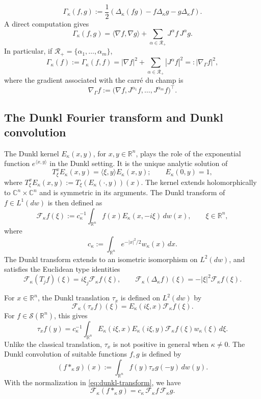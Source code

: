 \documentclass[11pt]{amsart}
\theoremstyle{definition}
\theoremstyle{remark}
\numberwithin{equation}{section}
\newcommand{\R}{\mathbb{R}}
\newcommand{\RR}{\mathcal{R}}
\begin{document}
\[
\Gamma_\kappa(f,g)
:=
\frac12
\left(
\Delta_\kappa(fg)
-
f\Delta_\kappa g
-
g\Delta_\kappa f
\right).
\]
A direct computation gives
\begin{equation}
\Gamma_\kappa(f,g)
=
\langle\nabla f,\nabla g\rangle
+
\sum_{\alpha\in\RR_+}
J^\alpha f\,J^\alpha g.
\end{equation}
In particular, if $\RR_+=\{\alpha_1,\ldots,\alpha_m\}$,
\[
\Gamma_\kappa(f)
:=
\Gamma_\kappa(f,f)
=
|\nabla f|^2
+
\sum_{\alpha\in\RR_+}|J^\alpha f|^2
=:
|\nabla_\Gamma f|^2,
\]
where the gradient associated with the
carr\'e du champ is
\begin{equation*}
\nabla_\Gamma f
:=
\bigl(
\nabla f,
J^{\alpha_1}f,\ldots,J^{\alpha_m}f
\bigr)^\top.
\end{equation*}

\subsection{The Dunkl Fourier transform and Dunkl convolution}

The Dunkl kernel $E_\kappa(x,y)$, for $x,y\in\R^n$, plays the role of
the exponential function $e^{\langle x,y\rangle}$ in the Dunkl setting.
It is the unique analytic solution of
\[
T_\xi^xE_\kappa(x,y)
=
\langle\xi,y\rangle E_\kappa(x,y);
\qquad
E_\kappa(0,y)=1,
\]
where $T_\xi^xE_\kappa(x,y):=T_\xi(E_\kappa(\cdot,y))(x)$.
The kernel extends holomorphically to
$\mathbb C^n\times\mathbb C^n$ and is symmetric in its arguments. The Dunkl transform of $f\in L^1(dw)$ is then defined as
\begin{equation}
\mathcal F_\kappa f(\xi)
:=
c_\kappa^{-1}
\int_{\R^n}
f(x)E_\kappa(x,-i\xi)\,dw(x),
\qquad
\xi\in\R^n,
\label{eq:dunkl-transform}
\end{equation}
where
\[
c_\kappa
:=
\int_{\R^n}
e^{-|x|^2/2}w_\kappa(x)\,dx.
\]
The Dunkl transform extends to an isometric isomorphism on $L^2(dw)$,
and satisfies the Euclidean type identities
\[
\mathcal F_\kappa(T_jf)(\xi)
=
i\xi_j\mathcal F_\kappa f(\xi),
\qquad
\mathcal F_\kappa(\Delta_\kappa f)(\xi)
=
-|\xi|^2\mathcal F_\kappa f(\xi).
\]

For $x\in\R^n$, the Dunkl translation $\tau_x$ is defined on $L^2(dw)$
by
\[
\mathcal F_\kappa(\tau_xf)(\xi)
=
E_\kappa(i\xi,x)\mathcal F_\kappa f(\xi).
\]
For $f\in\mathcal S(\R^n)$, this gives
\[
\tau_xf(y)
=
c_\kappa^{-1}
\int_{\R^n}
E_\kappa(i\xi,x)
E_\kappa(i\xi,y)
\mathcal F_\kappa f(\xi)
w_\kappa(\xi)\,d\xi.
\]
Unlike the classical translation, $\tau_x$ is not positive in general
when $\kappa\neq0$. The Dunkl convolution of suitable functions $f,g$ is defined by
\[
(f*_\kappa g)(x)
:=
\int_{\R^n}
f(y)\tau_xg(-y)\,dw(y).
\]
With the normalization in \eqref{eq:dunkl-transform}, we have
\[
\mathcal F_\kappa(f*_\kappa g)
=
c_\kappa\,
\mathcal F_\kappa f\,
\mathcal F_\kappa g.
\]
\end{document}
